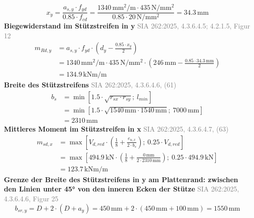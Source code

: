 \documentclass[11pt,a4paper]{article}
\newcommand{\normref}[1]{{\small\textcolor{gray}{#1}}}
\begin{document}
\begin{equation*}
x_y = \frac{a_{s,y} \cdot f_{yd}}{0.85 \cdot f_{cd}} = \frac{1340\,\mathrm{mm}^{2}/\mathrm{m} \cdot 435\,\mathrm{N}/\mathrm{mm}^{2}}{0.85 \cdot 20\,\mathrm{N}/\mathrm{mm}^{2}} = 34.3\,\mathrm{mm}
\end{equation*}
\noindent\textbf{Biegewiderstand im Stützstreifen in y} \hfill \normref{SIA 262:2025, 4.3.6.4.5; 4.2.1.5, Figur 12}
\begin{equation*}
\begin{aligned}
  m_{Rd,y} &= a_{s,y} \cdot f_{yd} \cdot \left(d_y - \frac{0.85 \cdot x_y}{2}\right) \\
  &= 1340\,\mathrm{mm}^{2}/\mathrm{m} \cdot 435\,\mathrm{N}/\mathrm{mm}^{2} \cdot \left(246\,\mathrm{mm} - \frac{0.85 \cdot 34.3\,\mathrm{mm}}{2}\right) \\
  &= 134.9\,\mathrm{kNm}/\mathrm{m}
\end{aligned}
\end{equation*}
\noindent\textbf{Breite des Stützstreifens} \hfill \normref{SIA 262:2025, 4.3.6.4.6, (61)}
\begin{equation*}
\begin{aligned}
  b_s &= \min\left[1.5 \cdot \sqrt{r_{sx} \cdot r_{sy}};\ l_{min}\right] \\
  &= \min\left[1.5 \cdot \sqrt{1540\,\mathrm{mm} \cdot 1540\,\mathrm{mm}};\ 7000\,\mathrm{mm}\right] \\
  &= 2310\,\mathrm{mm}
\end{aligned}
\end{equation*}
\noindent\textbf{Mittleres Moment im Stützstreifen in x} \hfill \normref{SIA 262:2025, 4.3.6.4.7, (63)}
\begin{equation*}
\begin{aligned}
  m_{sd,x} &= \max\left[V_{d,red} \cdot \left(\frac{1}{8} + \frac{e_{u,x}}{2 \cdot b_s}\right);\ 0.25 \cdot V_{d,red}\right] \\
  &= \max\left[494.9\,\mathrm{kN} \cdot \left(\frac{1}{8} + \frac{0\,\mathrm{mm}}{2 \cdot 2310\,\mathrm{mm}}\right);\ 0.25 \cdot 494.9\,\mathrm{kN}\right] \\
  &= 123.7\,\mathrm{kNm}/\mathrm{m}
\end{aligned}
\end{equation*}
\noindent\textbf{Grenze der Breite des Stützstreifens in y am Plattenrand: zwischen den Linien unter 45° von den inneren Ecken der Stütze} \hfill \normref{SIA 262:2025, 4.3.6.4.6, Figur 25}
\begin{equation*}
b_{sr,y} = D + 2 \cdot \left(D + a_y\right) = 450\,\mathrm{mm} + 2 \cdot \left(450\,\mathrm{mm} + 100\,\mathrm{mm}\right) = 1550\,\mathrm{mm}
\end{equation*}
\end{document}
